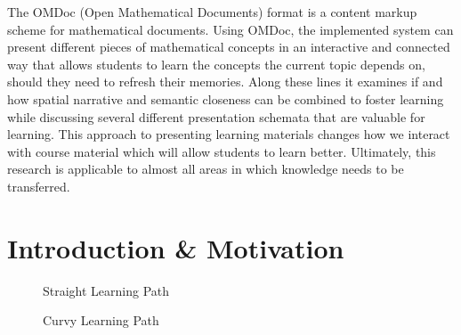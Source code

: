 \documentclass[twoside, 12pt]{article}
\begin{document}
The OMDoc (Open Mathematical Documents) format \cite{Kohlhase:OMDoc1.2} is a content markup scheme for mathematical documents. Using OMDoc, the implemented system can present different pieces of mathematical concepts in an interactive and connected way that allows students to learn the concepts the current topic depends on, should they need to refresh their memories. Along these lines it examines if and how spatial narrative and semantic closeness can be combined to foster learning while discussing several different presentation schemata that are valuable for learning. This approach to presenting learning materials changes how we interact with course material which will allow students to learn better. Ultimately, this research is applicable to almost all areas in which knowledge needs to be transferred.\\ 

\newpage
\tableofcontents

\clearpage
{}

\section{Introduction \& Motivation}
\label{sec:introduction}

\begin{figure}
\vspace{-28pt}
  \begin{center}
\vspace{-20pt}
  \caption{Straight Learning Path}
  \label{fig:straight}
\vspace{5pt}  

  \end{center}
\vspace{-20pt}
  \caption{Curvy Learning Path}
  \label{fig:curvy}
\vspace{-10pt}
\end{figure}
\end{document}
